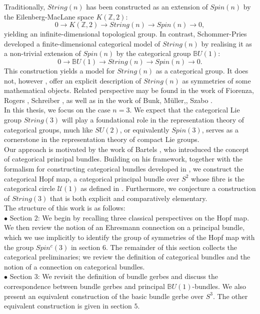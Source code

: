 \documentclass{article}
\theoremstyle{plain}
\theoremstyle{definition}
\begin{document}
\indent
Traditionally, $String(n)$ has been constructed as an extension of $Spin(n)$ by the Eilenberg-MacLane space $K(\mathbb{Z},2)$:
\[
0 \longrightarrow K(\mathbb{Z},2) \longrightarrow String(n) \longrightarrow Spin(n) \longrightarrow 0,
\]
yielding an infinite-dimensional topological group. In contrast, Schommer-Pries \cite{MR2800361} developed a finite-dimensional categorical model of $String(n)$ by realising it as a non-trivial extension of $Spin(n)$ by the categorical group $\mathbb{B}U(1)$:
\[
0 \longrightarrow \mathbb{B}U(1) \longrightarrow String(n) \longrightarrow Spin(n) \longrightarrow 0.
\]
This construction yields a model for $String(n)$ as a categorical group. It does not, however , offer an explicit description of $String(n)$ as symmetries of some mathematical objects. Related perspective may be found in the work of Fiorenza, Rogers , Schreiber \cite[Section 4.1]{MR3535115}, as well as in the work of Bunk, Müller,, Szabo \cite{MR4268834}. \\
\indent
In this thesis, we focus on the case $n = 3$. We expect that the categorical Lie group $String(3)$ will play a foundational role in the representation theory of categorical groups, much like $SU(2)$, or equivalently $Spin(3)$, serves as a cornerstone in the representation theory of compact Lie groups. \\
\indent
Our approach is motivated by the work of Bartels \cite{MR2709030}, who introduced the concept of categorical principal bundles. Building on his framework, together with the formalism for constructing categorical bundles developed in \cite{MR2805195}, we construct the categorical Hopf map, a categorical principal bundle over $S^2$ whose fibre is the categorical circle $\mathcal{U}(1)$ as defined in \cite{MR3764535}. Furthermore, we conjecture a construction of $String(3)$ that is both explicit and comparatively elementary. \\
The structure of this work is as follows: \\
$\bullet$ Section $2$:  We begin by recalling three classical perspectives on the Hopf map. We then review the notion of an Ehresmann connection on a principal bundle, which we use implicitly to identify the group of symmetries of the Hopf map with the group $Spin^c(3)$ in section $6$. The remainder of this section collects the categorical preliminaries; we review the definition of categorical bundles and the notion of a connection on categorical bundles. \\
$\bullet$ Section $3$: We revisit the definition of bundle gerbes and discuss the correspondence between bundle gerbes and principal $\mathbb{B}U(1)$-bundles. We also present an equivalent construction of the basic bundle gerbe over $S^3$. The other equivalent construction is given in section $5$. \\
\end{document}

